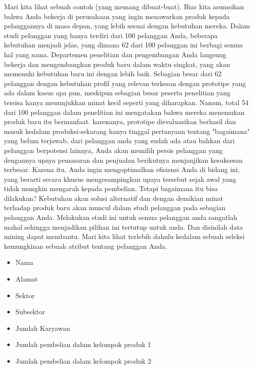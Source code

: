 \par Mari kita lihat sebuah contoh (yang memang dibuat-buat). Biar kita asumsikan bahwa Anda bekerja di perusahaan yang ingin menawarkan produk kepada pelanggannya di masa depan, yang lebih sesuai dengan kebutuhan mereka. Dalam studi pelanggan yang hanya terdiri dari 100 pelanggan Anda, beberapa kebutuhan menjadi jelas, yang dimana 62 dari 100 pelanggan ini berbagi semua hal yang sama. Departemen penelitian dan pengembangan Anda langsung bekerja dan mengembangkan produk baru dalam waktu singkat, yang akan memenuhi kebutuhan baru ini dengan lebih baik. Sebagian besar dari 62 pelanggan dengan kebutuhan profil yang relevan terkesan dengan prototipe yang ada dalam kasus apa pun, meskipun sebagian besar peserta penelitian yang tersisa hanya menunjukkan minat kecil seperti yang diharapkan. Namun, total 54 dari 100 pelanggan dalam penelitian ini mengatakan bahwa mereka menemukan produk baru itu bermanfaat. karenanya, prototipe dievaluasikan berhasil dan masuk kedalam produksi-sekarang hanya tinggal pertanyaan tentang "bagaimana" yang belum terjawab, dari pelanggan anda yang sudah ada atau bahkan dari pelanggan berpotensi lainnya, Anda akan memilih persis pelanggan yang dengannya upaya pemasaran dan penjualan berikutnya menjanjikan kesuksesan terbesar. Karena itu, Anda ingin mengoptimalkan efisiensi Anda di bidang ini, yang berarti secara khusus mengesampingkan upaya tersebut sejak awal yang tidak mungkin mengarah kepada pembelian. Tetapi bagaimana itu bisa dilakukan? Kebutuhan akan solusi alternatif dan dengan demikian minat terhadap produk baru akan muncul dalam studi pelanggan pada sebagian pelanggan Anda. Melakukan studi ini untuk semua pelanggan anda sangatlah mahal sehingga menjadikan pilihan ini tertutup untuk anda. Dan disinilah data mining dapat membantu. Mari kita lihat terlebih dahulu kedalam sebuah seleksi kemungkinan sebuah atribut tentang pelanggan Anda.

\begin{itemize}
    \item 	Nama 
 \item	Alamat 
 \item	Sektor 
 \item	Subsektor 
 \item	Jumlah Karyawan 
 \item	Jumlah pembelian dalam kelompok produk 1 
 \item	Jumlah pembelian dalam kelompok produk 2

\end{itemize}

